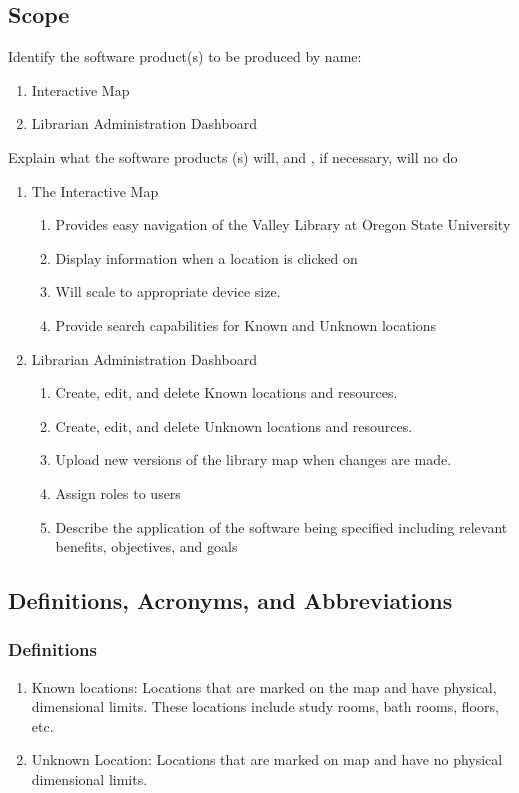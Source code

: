 \documentclass[letterpaper,10pt,titlepage]{article}
\begin{document}
\subsection{Scope}
Identify the software product(s) to be produced by name:
\begin{enumerate} 
	\item Interactive Map
	\item Librarian Administration Dashboard
\end{enumerate}
Explain what the software products (s) will, and , if necessary, will no do
\begin{enumerate}
	\item The Interactive Map 
    \begin{enumerate}
		\item Provides easy navigation of the Valley Library at Oregon State University
		\item Display information when a location is  clicked on
		\item Will scale to appropriate device size.
		\item Provide search capabilities for Known and Unknown locations
    \end{enumerate}
    \item Librarian Administration Dashboard
    \begin{enumerate}
		\item Create, edit, and delete Known locations and resources.
		\item Create, edit, and delete Unknown locations and resources.
		\item Upload new versions of the library map when changes are made.
		\item Assign roles to users
		\item Describe the application of the software being specified including relevant benefits, objectives, and goals
    \end{enumerate}
\end{enumerate}

\subsection{Definitions, Acronyms, and Abbreviations}

\subsubsection{Definitions}
\begin{enumerate}
	\item Known locations: Locations that are marked on the map and have physical, dimensional limits. These locations include study rooms, bath rooms, floors, etc. 
	\item Unknown Location: Locations that are marked on map and have no physical dimensional limits.
\end{enumerate}
\end{document}
